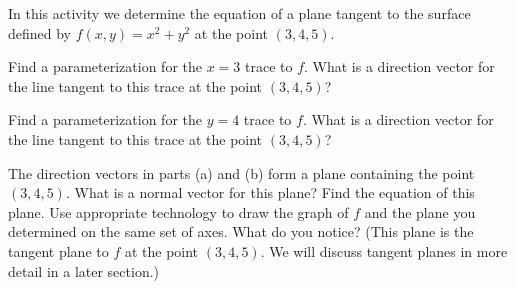 \begin{activity} \label{A:9.7.5} In this activity we determine the equation of a plane tangent to the surface defined by $f(x,y) = x^2+y^2$ at the point $(3,4,5)$.
    \ba
    \item Find a parameterization for the $x=3$ trace to $f$. What is a direction vector for the line tangent to this trace at the point $(3,4,5)$?



    \item  Find a parameterization for the $y=4$ trace to $f$. What is a direction vector for the line tangent to this trace at the point $(3,4,5)$?



    \item The direction vectors in parts (a) and (b) form a plane containing the point $(3,4,5)$. What is a normal vector for this plane? Find the equation of this plane. Use appropriate technology to draw the graph of $f$ and the plane you determined on the same set of axes. What do you notice? (This plane is the tangent plane to $f$ at the point $(3,4,5)$. We will discuss tangent planes in more detail in a later section.)



    \ea

\end{activity}
\begin{smallhint}

\end{smallhint}
\begin{bighint}

\end{bighint}
\begin{activitySolution}

\end{activitySolution}
\aftera
